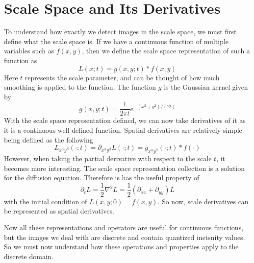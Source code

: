 \documentclass{article}
\begin{document}
\section{Scale Space and Its Derivatives}
To understand how exactly we detect images in the scale space, we must first define what the scale space is.
If we have a continuous function of multiple variables such as $f(x,y)$, then we define the scale space representation of such a function as 
\begin{equation}
  L(x;t) = g(x,y;t) * f(x,y)
\end{equation}
Here $t$ represents the scale parameter, and can be thought of how much smoothing is applied to the function. The function $g$ is the Gaussian kernel given by
\begin{equation}
  g(x,y;t) = \frac{1}{2 \pi t}e^{-(x^2+y^2)/(2t)}
\end{equation}
With the scale space representation defined, we can now take derivatives of it as it is a continuous well-defined function.
Spatial derivatives are relatively simple being defined as the following
\begin{equation}
  L_{x^{\alpha}y^{\beta}}(\cdot;t) = \partial_{x^{\alpha}y^{\beta}}L(\cdot;t) = g_{x^{\alpha}y^{\beta}}(\cdot;t) * f(\cdot)
\end{equation}
However, when taking the partial derivative with respect to the scale $t$, it becomes more interesting.
The scale space representation collection is a solution for the diffusion equation. Therefore is has the useful property of 
\begin{equation}
  \partial_t L = \frac{1}{2} \nabla^2 L = \frac{1}{2} (\partial_{xx} + \partial_{yy})L
\end{equation}
with the initial condition of $L(x,y;0) = f(x,y)$.
So now, scale derivatives can be represented as spatial derivatives. 

Now all these representations and operators are useful for continuous functions, but the images we deal with are discrete and contain quantized inetsnity values.
So we must now understand how these operations and properties apply to the discrete domain.
\end{document}
